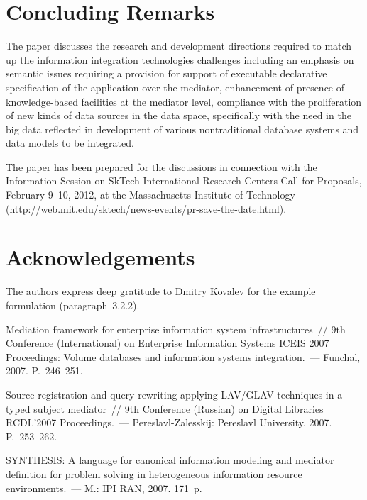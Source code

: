 \begin{multicols}{2}
\section{Concluding Remarks}

\noindent
The paper discusses the research and development directions required to match up the information 
integration technologies challenges including an emphasis on semantic issues requiring a provision for 
support of executable declarative specification of the application over the mediator, enhancement of 
presence of knowledge-based facilities at the mediator level, compliance with the proliferation of new 
kinds of data sources in the data space, specifically with the need in the big data reflected in development 
of various nontraditional database systems and data models to be integrated.

The paper has been prepared for the discussions in connection with the Information Session on 
SkTech International Research Centers Call for Proposals, February 9--10, 2012, 
at the Massachusetts 
Institute of Technology ({\sf http://web.mit.edu/sktech/news-events/pr-save-the-date.html}). 


\section*{Acknowledgements}
The authors express deep gratitude to Dmitry Kovalev for the example formulation 
(paragraph~3.2.2).
 
 {\small\frenchspacing
{%
\begin{thebibliography}{9}

Mediation framework for enterprise information system infrastructures~// 9th Conference 
(International) on Enterprise Information Systems ICEIS 2007 Proceedings:
Volume databases and information systems integration.~---
Funchal, 2007.  P.~246--251.

Source registration and query rewriting applying LAV/GLAV techniques in a typed subject 
mediator~// 9th Conference (Russian) on Digital Libraries RCDL'2007 Proceedings.~--- 
Pereslavl-Zalesskij: Pereslavl University, 2007. P.~253--262.

SYNTHESIS: A language for canonical information modeling and mediator definition for problem 
solving in heterogeneous information resource environments.~--- M.: IPI RAN, 2007. 171~p.


\end{thebibliography}}}
\end{multicols}
